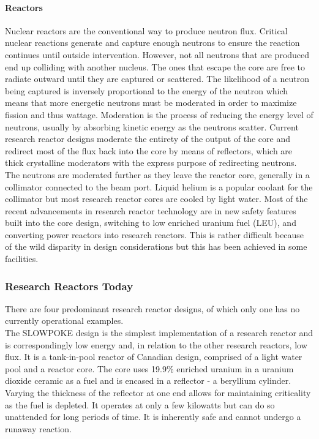 \paragraph{Reactors}
Nuclear reactors are the conventional way to produce neutron flux. Critical nuclear reactions generate and capture enough neutrons to ensure the reaction continues until outside intervention. However, not all neutrons that are produced end up colliding with another nucleus. The ones that escape the core are free to radiate outward until they are captured or scattered. The likelihood of a neutron being captured is inversely proportional to the energy of the neutron which means that more energetic neutrons must be moderated in order to maximize fission and thus wattage. Moderation is the process of reducing the energy level of neutrons, usually by absorbing kinetic energy as the neutrons scatter. Current research reactor designs moderate the entirety of the output of the core and redirect most of the flux back into the core by means of reflectors, which are thick crystalline moderators with the express purpose of redirecting neutrons. The neutrons are moderated further as they leave the reactor core, generally in a collimator connected to the beam port. Liquid helium is a popular coolant for the collimator but most research reactor cores are cooled by light water. Most of the recent advancements in research reactor technology are in new safety features built into the core design, switching to low enriched uranium fuel (LEU), and converting power reactors into research reactors. This is rather difficult because of the wild disparity in design considerations but this has been achieved in some facilities.

\subsubsection{Research Reactors Today}

There are four predominant research reactor designs, of which only one has no currently operational examples.\\

The SLOWPOKE design is the simplest implementation of a research reactor and is correspondingly low energy and, in relation to the other research reactors, low flux. It is a tank-in-pool reactor of Canadian design, comprised of a light water pool and a reactor core. The core uses 19.9\% enriched uranium in a uranium dioxide ceramic as a fuel and is encased in a reflector - a beryllium cylinder. Varying the thickness of the reflector at one end allows for maintaining criticality as the fuel is depleted. It operates at only a few kilowatts but can do so unattended for long periods of time. It is inherently safe and cannot undergo a runaway reaction.\\

